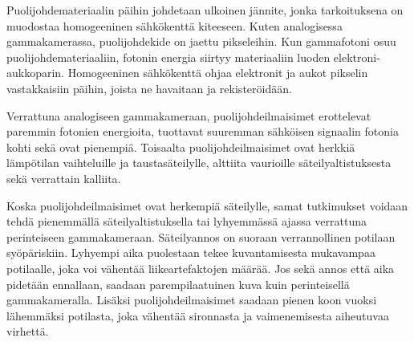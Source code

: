 Puolijohdemateriaalin päihin johdetaan ulkoinen jännite, jonka tarkoituksena on muodostaa homogeeninen sähkökenttä kiteeseen. Kuten analogisessa gammakamerassa, puolijohdekide on jaettu pikseleihin. Kun gammafotoni osuu puolijohdemateriaaliin, fotonin energia siirtyy materiaaliin luoden elektroni-aukkoparin. Homogeeninen sähkökenttä ohjaa elektronit ja aukot pikselin vastakkaisiin päihin, joista ne havaitaan ja rekisteröidään. 

Verrattuna analogiseen gammakameraan, puolijohdeilmaisimet erottelevat paremmin fotonien energioita, tuottavat suuremman sähköisen signaalin fotonia kohti sekä ovat pienempiä. Toisaalta puolijohdeilmaisimet ovat herkkiä lämpötilan vaihteluille ja taustasäteilylle, alttiita vaurioille säteilyaltistuksesta sekä verrattain kalliita.\cite{taillefer_scintillation_2022, knoll_radiation_2010, slomka_novel_2022}

Koska puolijohdeilmaisimet ovat herkempiä säteilylle, samat tutkimukset voidaan tehdä pienemmällä säteilyaltistuksella tai lyhyemmässä ajassa verrattuna perinteiseen gammakameraan\cite{knoll_radiation_2010}. Säteilyannos on suoraan verrannollinen potilaan syöpäriskiin. Lyhyempi aika puolestaan tekee kuvantamisesta mukavampaa potilaalle, joka voi vähentää liikeartefaktojen määrää. Jos sekä annos että aika pidetään ennallaan, saadaan parempilaatuinen kuva kuin perinteisellä gammakameralla.\cite{taillefer_scintillation_2022} Lisäksi puolijohdeilmaisimet saadaan pienen koon vuoksi lähemmäksi potilasta, joka vähentää sironnasta ja vaimenemisesta aiheutuvaa virhettä\cite{knoll_radiation_2010, taillefer_scintillation_2022}.